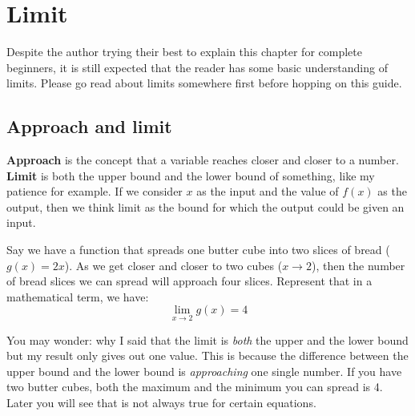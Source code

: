\chapter{Limit}
Despite the author trying their best to explain this chapter for complete beginners, it is still expected that the reader has some basic understanding of limits. Please go read about limits somewhere first before hopping on this guide.

\section{Approach and limit}
\textbf{Approach} is the concept that a variable reaches closer and closer to a number. \textbf{Limit} is both the upper bound and the lower bound of something, like my patience for example. If we consider $x$ as the input and the value of $f(x)$ as the output, then we think limit as the bound for which the output could be given an input. 

Say we have a function that spreads one butter cube into two slices of bread ($g(x)=2x$). As we get closer and closer to two cubes ($x\to2$), then the number of bread slices we can spread will approach four slices. Represent that in a mathematical term, we have:
\[ \lim_{x\to2}g(x) = 4 \]

You may wonder: why I said that the limit is \textit{both} the upper and the lower bound but my result only gives out one value. This is because the difference between the upper bound and the lower bound is \textit{approaching} one single number. If you have two butter cubes, both the maximum and the minimum you can spread is 4. Later you will see that is not always true for certain equations.


